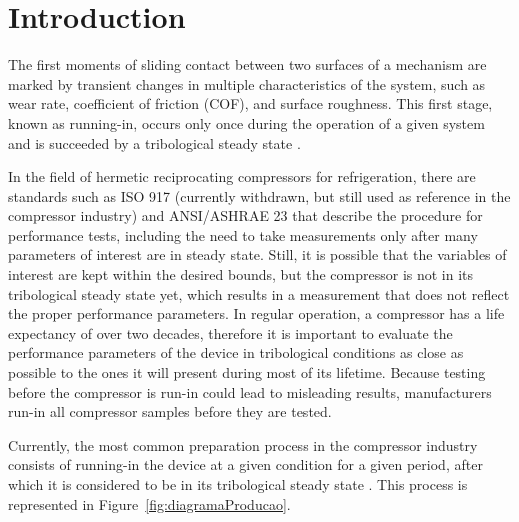 \documentclass[preprint,11pt,number]{elsarticle}
\begin{document}

\section{Introduction}\label{sec:Introduction}

The first moments of sliding contact between two surfaces of a mechanism are marked by transient changes in multiple characteristics of the system, such as wear rate, coefficient of friction (COF), and surface roughness. This first stage, known as running-in, occurs only once during the operation of a given system and is succeeded by a tribological steady state \cite{Blau2009}.

In the field of hermetic reciprocating compressors for refrigeration, there are standards such as ISO 917 \cite{ISO917} (currently withdrawn, but still used as reference in the compressor industry) and ANSI/ASHRAE 23 \cite{ASHRAE2005} that describe the procedure for performance tests, including the need to take measurements only after many parameters of interest are in steady state. Still, it is possible that the variables of interest are kept within the desired bounds, but the compressor is not in its tribological steady state yet, which results in a measurement that does not reflect the proper performance parameters. In regular operation, a compressor has a life expectancy of over two decades, therefore it is important to evaluate the performance parameters of the device in tribological conditions as close as possible to the ones it will present during most of its lifetime. Because testing before the compressor is run-in could lead to misleading results, manufacturers run-in all compressor samples before they are tested.

Currently, the most common preparation process in the compressor industry consists of running-in the device at a given condition for a given period, after which it is considered to be in its tribological steady state \cite{Borges2021, Mello2022}. This process is represented in Figure~\ref{fig:diagramaProducao}.
\end{document}
